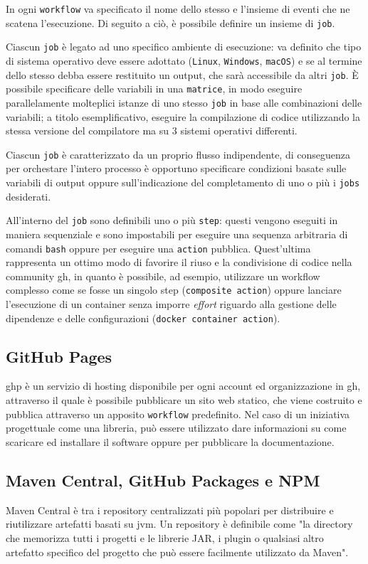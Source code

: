 \documentclass[12pt,a4paper,openright,twoside]{book}
\begin{document}
In ogni \texttt{workflow} va specificato il nome dello stesso e l'insieme di eventi che ne scatena 
l'esecuzione. 
Di seguito a ciò, è possibile definire un insieme di \texttt{job}.

Ciascun \texttt{job} è legato ad uno specifico ambiente di esecuzione: va definito che tipo di
sistema operativo deve essere adottato (\texttt{Linux}, \texttt{Windows}, \texttt{macOS})
e se al termine dello stesso debba essere restituito un output, che sarà accessibile da altri \texttt{job}.
È possibile specificare delle variabili in una \texttt{matrice}, in modo eseguire parallelamente molteplici istanze di uno stesso \texttt{job} 
in base alle combinazioni delle variabili; a titolo esemplificativo, eseguire la compilazione di codice utilizzando
la stessa versione del compilatore ma su 3 sistemi operativi differenti.  

Ciascun \texttt{job} è caratterizzato da un proprio flusso indipendente, di conseguenza
per orchestare l'intero processo è opportuno specificare condizioni basate sulle variabili di output 
oppure sull'indicazione del completamento di uno o più i \texttt{jobs} desiderati.

All'interno del \texttt{job} sono definibili uno o più \texttt{step}: questi vengono eseguiti in maniera sequenziale
e sono impostabili per eseguire una sequenza arbitraria di comandi \texttt{bash} oppure
per eseguire una \texttt{action} pubblica.
Quest'ultima rappresenta un ottimo modo di favorire il riuso
e la condivisione di codice nella community \ac{gh}, in quanto è possibile, ad esempio, utilizzare un workflow complesso
come se fosse un singolo step (\texttt{composite action}) oppure lanciare l'esecuzione di un container senza
imporre \textit{effort} riguardo alla gestione delle dipendenze e delle configurazioni (\texttt{docker container action}).

\subsection{GitHub Pages}
 \ac{ghp} è un servizio di hosting disponibile per ogni account ed organizzazione in \ac{gh},
 attraverso il quale è possibile pubblicare un sito web statico, che viene costruito e
 pubblica attraverso un apposito \texttt{workflow} predefinito. 
 Nel caso di un iniziativa progettuale come una libreria, può essere utilizzato dare informazioni 
 su come scaricare ed installare il software oppure per pubblicare la documentazione.

\subsection{Maven Central, GitHub Packages e NPM}
Maven Central è tra i repository centralizzati più popolari per distribuire e riutilizzare artefatti basati su \ac{jvm}.
Un repository è definibile come "la directory che memorizza tutti i progetti e le librerie JAR, i plugin
o qualsiasi altro artefatto specifico del progetto che può essere facilmente utilizzato da Maven"\cite{kozak2022three}.
\end{document}
